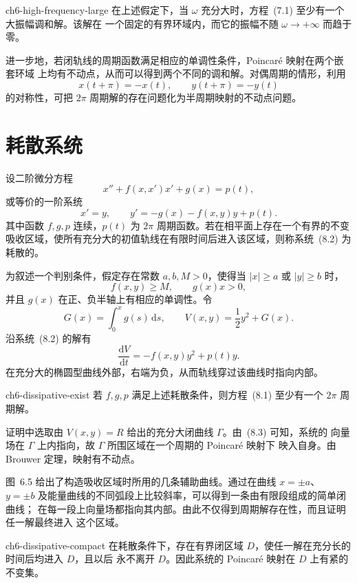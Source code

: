 \begin{theorem}{}{ch6-high-frequency-large}
在上述假定下，当 $\omega$ 充分大时，方程~(7.1) 至少有一个大振幅调和解。该解在
一个固定的有界环域内，而它的振幅不随 $\omega\to+\infty$ 而趋于零。
\end{theorem}

进一步地，若闭轨线的周期函数满足相应的单调性条件，Poincar\'e 映射在两个嵌套环域
上均有不动点，从而可以得到两个不同的调和解。对偶周期的情形，利用
\[
  x(t+\pi)=-x(t),\qquad y(t+\pi)=-y(t)
\]
的对称性，可把 $2\pi$ 周期解的存在问题化为半周期映射的不动点问题。

\section{耗散系统}

设二阶微分方程
\[
  x''+f(x,x')x'+g(x)=p(t), \tag{8.1}
\]
或等价的一阶系统
\[
  x'=y,\qquad y'=-g(x)-f(x,y)y+p(t). \tag{8.2}
\]
其中函数 $f,g,p$ 连续，$p(t)$ 为 $2\pi$ 周期函数。若在相平面上存在一个有界的不变
吸收区域，使所有充分大的初值轨线在有限时间后进入该区域，则称系统~(8.2) 为耗散的。

为叙述一个判别条件，假定存在常数 $a,b,M>0$，使得当 $|x|\geq a$ 或 $|y|\geq b$ 时，
\[
  f(x,y)\geq M,\qquad g(x)x>0,
\]
并且 $g(x)$ 在正、负半轴上有相应的单调性。令
\[
  G(x)=\int_0^xg(s)\,\mathrm ds,
  \qquad V(x,y)=\frac12y^2+G(x).
\]
沿系统~(8.2) 的解有
\[
  \frac{\mathrm dV}{\mathrm dt}=-f(x,y)y^2+p(t)y. \tag{8.3}
\]
在充分大的椭圆型曲线外部，右端为负，从而轨线穿过该曲线时指向内部。

\begin{theorem}{}{ch6-dissipative-exist}
若 $f,g,p$ 满足上述耗散条件，则方程~(8.1) 至少有一个 $2\pi$ 周期解。
\end{theorem}

证明中选取由 $V(x,y)=R$ 给出的充分大闭曲线 $\Gamma$。由~(8.3) 可知，系统的
向量场在 $\Gamma$ 上内指向，故 $\Gamma$ 所围区域在一个周期的 Poincar\'e 映射下
映入自身。由 Brouwer 定理，映射有不动点。


图~6.5 给出了构造吸收区域时所用的几条辅助曲线。通过在曲线 $x=\pm a$、
$y=\pm b$ 及能量曲线的不同弧段上比较斜率，可以得到一条由有限段组成的简单闭曲线；
在每一段上向量场都指向其内部。由此不仅得到周期解存在性，而且证明任一解最终进入
这个区域。

\begin{theorem}{}{ch6-dissipative-compact}
在耗散条件下，存在有界闭区域 $D$，使任一解在充分长的时间后均进入 $D$，且以后
永不离开 $D$。因此系统的 Poincar\'e 映射在 $D$ 上有紧的不变集。
\end{theorem}


